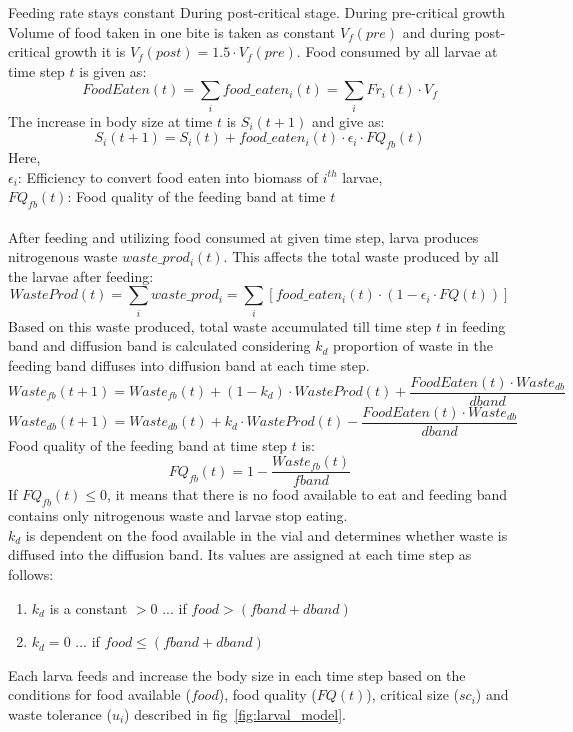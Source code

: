 \noindent Feeding rate stays constant During post-critical stage. During pre-critical growth Volume of food taken in one bite is taken as constant $V_{f}(pre)$ and during post-critical growth it is $V_{f}(post) = 1.5\cdot V_{f}(pre)$. Food consumed by all larvae at time step $t$ is given as:
\[FoodEaten(t) = \sum_{i}food\_eaten_{i}(t) = \sum_{i}Fr_{i}(t)\cdot V_{f}\]
The increase in body size at time $t$ is $S_{i}(t+1)$ and give as:
\[S_{i}(t+1) = S_{i}(t) + food\_eaten_{i}(t)\cdot \epsilon_{i}\cdot FQ_{fb}(t)\]
Here,\\
$\epsilon_{i}$: Efficiency to convert food eaten into biomass of $i^{th}$ larvae,\\
$FQ_{fb}(t)$: Food quality of the feeding band at time $t$\\ \\
After feeding and utilizing food consumed at given time step, larva produces nitrogenous waste $waste\_prod_{i}(t)$. This affects the total waste produced by all the larvae after feeding:
\[WasteProd(t) = \sum_{i}waste\_prod_{i} = \sum_{i}[food\_eaten_{i}(t)\cdot (1-\epsilon_{i}\cdot FQ(t))]\]
Based on this waste produced, total waste accumulated till time step $t$ in feeding band and diffusion band is calculated considering $k_{d}$ proportion of waste in the feeding band diffuses into diffusion band at each time step.
\[Waste_{fb}(t+1) = Waste_{fb}(t) + (1-k_{d})\cdot WasteProd(t) + \frac{FoodEaten(t)\cdot Waste_{db}}{dband}\]
\[Waste_{db}(t+1) = Waste_{db}(t) + k_{d}\cdot WasteProd(t) - \frac{FoodEaten(t)\cdot Waste_{db}}{dband}\]
Food quality of the feeding band at time step $t$ is:
\[FQ_{fb}(t) = 1 - \frac{Waste_{fb}(t)}{fband}\]
If $FQ_{fb}(t) \leq 0 $, it means that there is no food available to eat and feeding band contains only nitrogenous waste and larvae stop eating.\\
$k_{d}$ is dependent on the food available in the vial and determines whether waste is diffused into the diffusion band. Its values are assigned at each time step as follows:
\begin{enumerate}[i]
  \item $k_{d}$ is a constant $> 0$ ... if $food > (fband+dband)$
  \item $k_{d} = 0$ ... if $food \leq (fband+dband)$
\end{enumerate}
Each larva feeds and increase the body size in each time step based on the conditions for food available ($food$), food quality ($FQ(t)$), critical size ($sc_{i}$) and waste tolerance ($u_{i}$) described in fig~\ref{fig:larval_model}.\\

